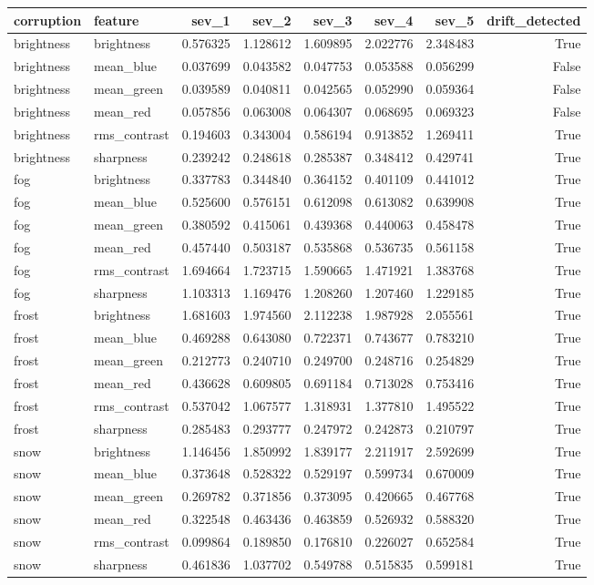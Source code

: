 \begin{tabular}{llrrrrrr}
\toprule
corruption & feature & sev_1 & sev_2 & sev_3 & sev_4 & sev_5 & drift_detected \\
\midrule
brightness & brightness & 0.576325 & 1.128612 & 1.609895 & 2.022776 & 2.348483 & True \\
brightness & mean_blue & 0.037699 & 0.043582 & 0.047753 & 0.053588 & 0.056299 & False \\
brightness & mean_green & 0.039589 & 0.040811 & 0.042565 & 0.052990 & 0.059364 & False \\
brightness & mean_red & 0.057856 & 0.063008 & 0.064307 & 0.068695 & 0.069323 & False \\
brightness & rms_contrast & 0.194603 & 0.343004 & 0.586194 & 0.913852 & 1.269411 & True \\
brightness & sharpness & 0.239242 & 0.248618 & 0.285387 & 0.348412 & 0.429741 & True \\
fog & brightness & 0.337783 & 0.344840 & 0.364152 & 0.401109 & 0.441012 & True \\
fog & mean_blue & 0.525600 & 0.576151 & 0.612098 & 0.613082 & 0.639908 & True \\
fog & mean_green & 0.380592 & 0.415061 & 0.439368 & 0.440063 & 0.458478 & True \\
fog & mean_red & 0.457440 & 0.503187 & 0.535868 & 0.536735 & 0.561158 & True \\
fog & rms_contrast & 1.694664 & 1.723715 & 1.590665 & 1.471921 & 1.383768 & True \\
fog & sharpness & 1.103313 & 1.169476 & 1.208260 & 1.207460 & 1.229185 & True \\
frost & brightness & 1.681603 & 1.974560 & 2.112238 & 1.987928 & 2.055561 & True \\
frost & mean_blue & 0.469288 & 0.643080 & 0.722371 & 0.743677 & 0.783210 & True \\
frost & mean_green & 0.212773 & 0.240710 & 0.249700 & 0.248716 & 0.254829 & True \\
frost & mean_red & 0.436628 & 0.609805 & 0.691184 & 0.713028 & 0.753416 & True \\
frost & rms_contrast & 0.537042 & 1.067577 & 1.318931 & 1.377810 & 1.495522 & True \\
frost & sharpness & 0.285483 & 0.293777 & 0.247972 & 0.242873 & 0.210797 & True \\
snow & brightness & 1.146456 & 1.850992 & 1.839177 & 2.211917 & 2.592699 & True \\
snow & mean_blue & 0.373648 & 0.528322 & 0.529197 & 0.599734 & 0.670009 & True \\
snow & mean_green & 0.269782 & 0.371856 & 0.373095 & 0.420665 & 0.467768 & True \\
snow & mean_red & 0.322548 & 0.463436 & 0.463859 & 0.526932 & 0.588320 & True \\
snow & rms_contrast & 0.099864 & 0.189850 & 0.176810 & 0.226027 & 0.652584 & True \\
snow & sharpness & 0.461836 & 1.037702 & 0.549788 & 0.515835 & 0.599181 & True \\
\bottomrule
\end{tabular}

